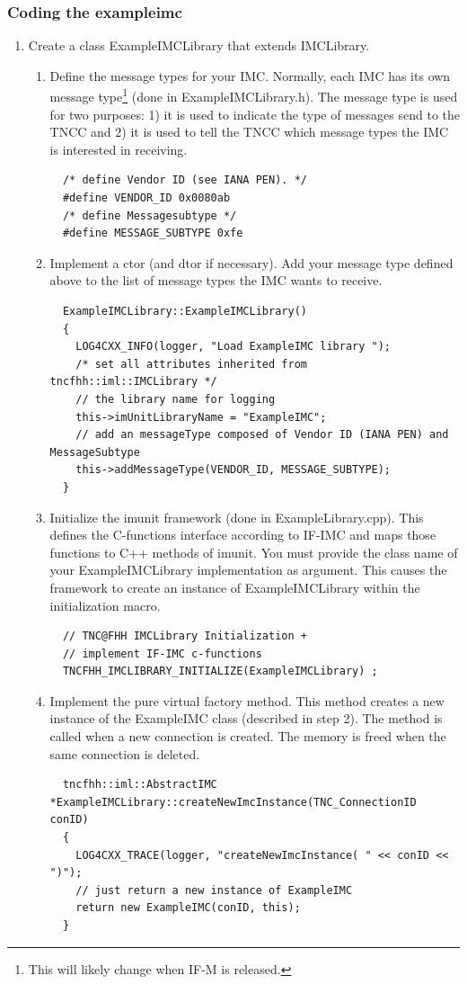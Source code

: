 \documentclass[a4paper,10pt]{scrartcl}
\begin{document}
\subsubsection{Coding the exampleimc}
\begin{enumerate}
 \item Create a class ExampleIMCLibrary that extends IMCLibrary.
 \begin{enumerate}
  \item Define the message types for your IMC. Normally, each IMC has its own message type\footnote{This
  will likely change when IF-M is released.} (done in ExampleIMCLibrary.h). The message type is used for two purposes: 1) it is used
  to indicate the type of messages send to the TNCC and 2) it is used to tell the TNCC which message types the IMC is interested in receiving.
  \begin{lstlisting}
  /* define Vendor ID (see IANA PEN). */
  #define VENDOR_ID 0x0080ab
  /* define Messagesubtype */
  #define MESSAGE_SUBTYPE 0xfe
  \end{lstlisting}

  \item Implement a ctor (and dtor if necessary). Add your message type defined above to the list
  of message types the IMC wants to receive.
  \begin{lstlisting}
  ExampleIMCLibrary::ExampleIMCLibrary()
  {
    LOG4CXX_INFO(logger, "Load ExampleIMC library ");
    /* set all attributes inherited from tncfhh::iml::IMCLibrary */
    // the library name for logging
    this->imUnitLibraryName = "ExampleIMC";
    // add an messageType composed of Vendor ID (IANA PEN) and MessageSubtype
    this->addMessageType(VENDOR_ID, MESSAGE_SUBTYPE);
  }
  \end{lstlisting}

  \item Initialize the imunit framework (done in ExampleLibrary.cpp). This defines
  the C-functions interface according to IF-IMC and maps those functions to C++ methods
  of imunit. You must provide the class name of your ExampleIMCLibrary implementation
  as argument. This causes the framework to create an instance of ExampleIMCLibrary
  within the initialization macro.
  \begin{lstlisting}
  // TNC@FHH IMCLibrary Initialization +
  // implement IF-IMC c-functions
  TNCFHH_IMCLIBRARY_INITIALIZE(ExampleIMCLibrary) ;
  \end{lstlisting}

  \item Implement the pure virtual factory method. This method creates a new instance of
  the ExampleIMC class (described in step 2). The method is called when a new connection
  is created. The memory is freed when the same connection is deleted.
  \begin{lstlisting}
  tncfhh::iml::AbstractIMC *ExampleIMCLibrary::createNewImcInstance(TNC_ConnectionID conID)
  {
    LOG4CXX_TRACE(logger, "createNewImcInstance( " << conID << ")");
    // just return a new instance of ExampleIMC
    return new ExampleIMC(conID, this);
  }
  \end{lstlisting}
 \end{enumerate}


\end{enumerate}
\end{document}
